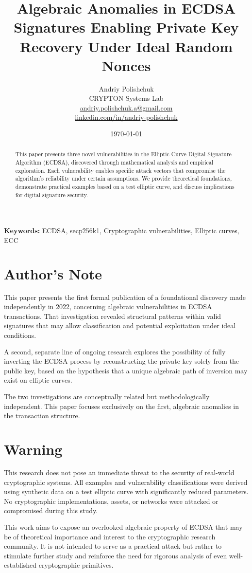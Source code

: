 \documentclass[11pt]{article}
\title{Algebraic Anomalies in ECDSA Signatures Enabling Private Key Recovery Under Ideal Random Nonces}
\author{
  Andriy Polishchuk\\
  CRYPTON Systems Lab\\
  \href{mailto:andriy.polishchuk.a@gmail.com}{andriy.polishchuk.a@gmail.com}\\
  \href{https://www.linkedin.com/in/andriy-polishchuk}{linkedin.com/in/andriy-polishchuk}
}
\date{\today}
\begin{document}
\maketitle

\begin{abstract}
This paper presents three novel vulnerabilities in the Elliptic Curve Digital Signature Algorithm (ECDSA), discovered through mathematical analysis and empirical exploration. Each vulnerability enables specific attack vectors that compromise the algorithm's reliability under certain assumptions. We provide theoretical foundations, demonstrate practical examples based on a test elliptic curve, and discuss implications for digital signature security.
\end{abstract}

\textbf{Keywords:} ECDSA, secp256k1, Cryptographic vulnerabilities, Elliptic curves, ECC

\section*{Author's Note}
This paper presents the first formal publication of a foundational discovery made independently in 2022, concerning algebraic vulnerabilities in ECDSA transactions. That investigation revealed structural patterns within valid signatures that may allow classification and potential exploitation under ideal conditions.

A second, separate line of ongoing research explores the possibility of fully inverting the ECDSA process by reconstructing the private key solely from the public key, based on the hypothesis that a unique algebraic path of inversion may exist on elliptic curves.

The two investigations are conceptually related but methodologically independent. This paper focuses exclusively on the first, algebraic anomalies in the transaction structure.

\section*{Warning}
This research does not pose an immediate threat to the security of real-world cryptographic systems. All examples and vulnerability classifications were derived using synthetic data on a test elliptic curve with significantly reduced parameters. No cryptographic implementations, assets, or networks were attacked or compromised during this study.

This work aims to expose an overlooked algebraic property of ECDSA that may be of theoretical importance and interest to the cryptographic research community. It is not intended to serve as a practical attack but rather to stimulate further study and reinforce the need for rigorous analysis of even well-established cryptographic primitives.
\end{document}
